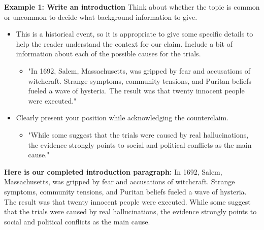 \documentclass[12pt]{article}
\begin{document}
\begin{tcolorbox}[colframe=black!60, colback=white, 
coltitle=black, colbacktitle=black!15, fonttitle=\bfseries\Large, 
title=Examples, halign title=center, left=10pt, right=10pt, top=10pt, bottom=15pt]

\textbf{Example 1: Write an introduction}
Think about whether the topic is common or uncommon to decide what background information to give.
    \begin{itemize}
        \item This is a historical event, so it is appropriate to give some specific details to help the reader understand the context for our claim. Include a bit of information about each of the possible causes for the trials.
        \begin{itemize}
            \item "In 1692, Salem, Massachusetts, was gripped by fear and accusations of witchcraft. Strange symptoms, community tensions, and Puritan beliefs fueled a wave of hysteria. The result was that twenty innocent people were executed." 



        \end{itemize}


\end{itemize}
\begin{itemize}
    \item Clearly present your position while acknowledging the counterclaim.
    \begin{itemize}
        \item "While some suggest that the trials were caused by real hallucinations, the evidence strongly points to social and political conflicts as the main cause." 
    \end{itemize}
\end{itemize}

\textbf{Here is  our completed introduction paragraph:} In 1692, Salem, Massachusetts, was gripped by fear and accusations of witchcraft. Strange symptoms, community tensions, and Puritan beliefs fueled a wave of hysteria. The result was that twenty innocent people were executed. While some suggest that the trials were caused by real hallucinations, the evidence strongly points to social and political conflicts as the main cause.  








     \end{tcolorbox}
\end{document}
